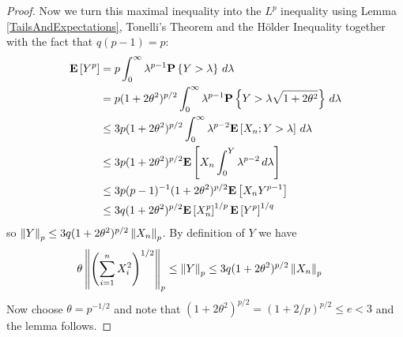 \begin{proof}
Now we turn this maximal inequality into the $L^p$ inequality using Lemma \ref{TailsAndExpectations}, Tonelli's Theorem and the H\"{o}lder Inequality together with the fact that $q(p-1) = p$:
\begin{align*}
\textbf{E}\left[Y^p\right] 
&= p \int_0^\infty \lambda^{p-1} \textbf{P}\left \{Y > \lambda  \right \}  \, d\lambda \\
&= p (1+2\theta^2)^{p/2} \int_0^\infty \lambda^{p-1} \textbf{P}\left \{Y > \lambda \sqrt{1+2\theta^2} \right \}  \, d\lambda \\
&\leq 3 p (1+2\theta^2)^{p/2}\int_0^\infty \lambda^{p-2}  \textbf{E}\left[X_n; Y > \lambda\right] \, d\lambda \\
&\leq 3 p (1+2\theta^2)^{p/2} \textbf{E}\left[ X_n \int_0^Y \lambda^{p-2} \, d\lambda\right] \\
&\leq 3 p (p-1)^{-1} (1+2\theta^2)^{p/2}\textbf{E}\left[ X_n Y^{p-1} \right] \\
&\leq 3 q (1+2\theta^2)^{p/2}\textbf{E}\left[ X^p_n\right]^{1/p}  \textbf{E}\left[Y^p\right]^{1/q}\\
\end{align*}
so $\left \lVert Y \right \rVert_p \leq 3q (1+2\theta^2)^{p/2}\left \lVert X_n \right \rVert_p$.  By definition of $Y$ we have
\begin{align*}
\theta \left \lVert \left ( \sum_{i=1}^n X_i^2 \right)^{1/2} \right \rVert_p &\leq \left \lVert Y \right \rVert_p \leq 3q (1+2\theta^2)^{p/2} \left \lVert X_n \right \rVert_p
\end{align*}
Now choose $\theta = p^{-1/2}$ and note that 
$(1+2\theta^2)^{p/2} = (1 + 2/p)^{p/2} \leq e < 3$ and the lemma follows.
\end{proof}

